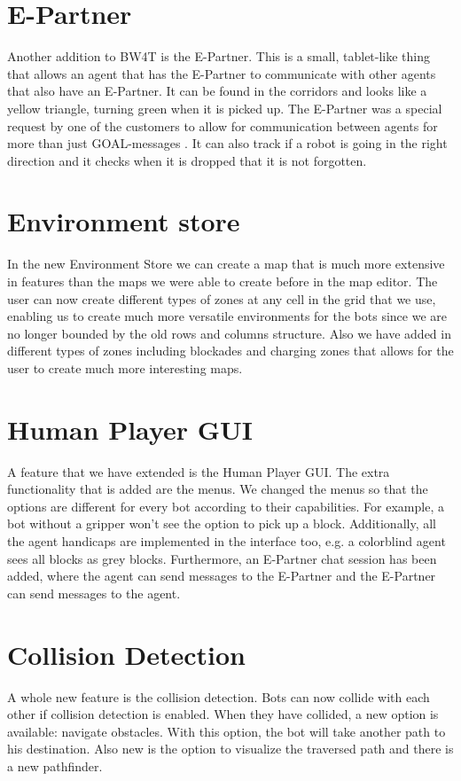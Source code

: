 \section{E-Partner}
Another addition to BW4T is the E-Partner. This is a small, tablet-like thing that allows an agent that has the E-Partner to communicate with other agents that also have an E-Partner. It can be found in the corridors and looks like a yellow triangle, turning green when it is picked up. The E-Partner was a special request by one of the customers to allow for communication between agents for more than just GOAL-messages \cite{hindriks2012goal}. It can also track if a robot is going in the right direction and it checks when it is dropped that it is not forgotten.

\section{Environment store}
In the new Environment Store we can create a map that is much more extensive in features than the maps we were able to create before in the map editor. The user can now create different types of zones at any cell in the grid that we use, enabling us to create much more versatile environments for the bots since we are no longer bounded by the old rows and columns structure. Also we have added in different types of zones including blockades and charging zones that allows for the user to create much more interesting maps.

\section{Human Player GUI}
A feature that we have extended is the Human Player GUI. The extra functionality that is added are the menus. We changed the menus so that the options are different for every bot according to their capabilities. For example, a bot without a gripper won't see the option to pick up a block. Additionally, all the agent handicaps are implemented in the interface too, e.g. a colorblind agent sees all blocks as grey blocks. Furthermore, an E-Partner chat session has been added, where the agent can send messages to the E-Partner and the E-Partner can send messages to the agent.

\section{Collision Detection}
A whole new feature is the collision detection. Bots can now collide with each other if collision detection is enabled. When they have collided, a new option is available: navigate obstacles. With this option, the bot will take another path to his destination.
Also new is the option to visualize the traversed path and there is a new pathfinder.

